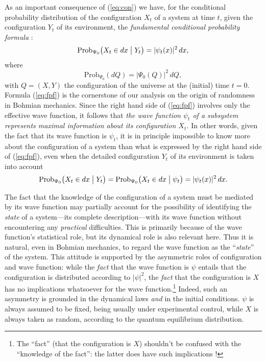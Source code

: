\documentclass[12pt]{article}
\newcommand{\BM}{Bohmian mechanics}
\newcommand{\wf}{wave function}
\newcommand{\qe}{quantum equilibrium}
\newcommand{\Prob}{\mbox{Prob}}
\begin{document}
As an important consequence of (\ref{eq:con}) we have, for the
conditional probability distribution of the configuration $X_{t}$ of a
system at time $t$, given the configuration $Y_{t}$ of its
environment, the \emph{fundamental conditional probability formula}
\cite{DGZ92a}:
%
\begin{equation}
\Prob_{\Psi_{0}} \bigl(X_t \in dx \bigm| Y_t\bigr)=|\psi_t(x)|^2\,dx,
\label{eq:fpf}
\end{equation}
%
where
%
\begin{displaymath}
\Prob_{\Psi_{0}}(dQ)={|\Psi_0(Q)|}^2\,dQ,
\end{displaymath}
%
with $Q=(X,Y)$ the configuration of the universe at the (initial) time
$t=0$.  Formula (\ref{eq:fpf}) is the cornerstone of our analysis
\cite{DGZ92a} on the origin of randomness in \BM{}.  Since the right
hand side of (\ref{eq:fpf}) involves only the effective \wf{}, it
follows that \emph{the \wf{} $\psi_t$ of a subsystem represents
   maximal information about its configuration $X_t$.} In other words,
given the fact that its \wf{} is $\psi_t$, it is in principle
impossible to know more about the configuration of a system than what
is expressed by the right hand side of (\ref{eq:fpf}), even when the
detailed configuration $Y_t$ of its environment is taken into account
\cite{DGZ92a}
%
\begin{equation}
\Prob_{\Psi_{0}}\bigl(X_t \in dx \bigm| Y_t\bigr)=
\Prob_{\Psi_{0}}\bigl(X_t \in dx \bigm|
\psi_t\bigr)=|\psi_t(x)|^2\,dx.
\label{eq:fpfp}
\end{equation}
%

The fact that the knowledge of the configuration of a system must be
mediated by its \wf{} may partially account for the possibility of
identifying the \emph{state} of a system---its complete
description---with its \wf{} without encountering any \emph{practical}
difficulties.  This is primarily because of the \wf{}'s statistical
role, but its dynamical role is also relevant here.  Thus it is
natural, even in \BM{}, to regard the \wf{} as the ``\emph{state}'' of
the system.  This attitude is supported by the asymmetric roles of
configuration and \wf{}: while the \emph{fact} that the \wf{} is
$\psi$ entails that the configuration is distributed according to
$|\psi|^2$, the \emph{ fact} that the configuration is $X$ has no
implications whatsoever for the \wf{}.\footnote{The ``fact'' (that the
   configuration is $X$) shouldn't be confused with the ``knowledge of
   the fact'': the latter does have such implications \cite{DGZ92a}!}
Indeed, such an asymmetry is grounded in the dynamical laws \emph{and}
in the initial conditions.  $\psi$ is always assumed to be fixed,
being usually under experimental control, while $X$ is always taken as
random, according to the \qe{} distribution.
\end{document}
